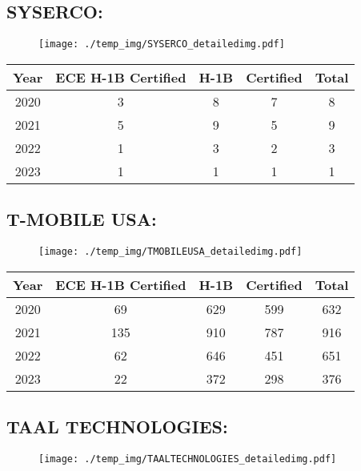 \documentclass{article}%
\begin{document}
%
\newpage%
\subsection{SYSERCO:}%
\label{subsec:SYSERCO}%
\label{SYSERCOdetailed}%


\begin{figure}[htbp]%
\centering%
\texttt{[image: ./temp\_img/SYSERCO\_detailedimg.pdf]}%
\end{figure}

%
\begin{longtable}{c|c|c|c|c}%
\hline%
Year&ECE H{-}1B Certified&H{-}1B&Certified&Total\\%
\hline%
2020&3&8&7&8\\%
\hline%
2021&5&9&5&9\\%
\hline%
2022&1&3&2&3\\%
\hline%
2023&1&1&1&1\\%
\hline%
\end{longtable}

%
\newpage%
\subsection{T{-}MOBILE USA:}%
\label{subsec:T{-}MOBILEUSA}%
\label{TMOBILEUSAdetailed}%


\begin{figure}[htbp]%
\centering%
\texttt{[image: ./temp\_img/TMOBILEUSA\_detailedimg.pdf]}%
\end{figure}

%
\begin{longtable}{c|c|c|c|c}%
\hline%
Year&ECE H{-}1B Certified&H{-}1B&Certified&Total\\%
\hline%
2020&69&629&599&632\\%
\hline%
2021&135&910&787&916\\%
\hline%
2022&62&646&451&651\\%
\hline%
2023&22&372&298&376\\%
\hline%
\end{longtable}

%
\newpage%
\subsection{TAAL TECHNOLOGIES:}%
\label{subsec:TAALTECHNOLOGIES}%
\label{TAALTECHNOLOGIESdetailed}%


\begin{figure}[htbp]%
\centering%
\texttt{[image: ./temp\_img/TAALTECHNOLOGIES\_detailedimg.pdf]}%
\end{figure}
\end{document}

